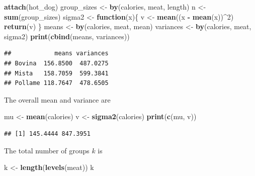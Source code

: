 \documentclass[
]{article}
\newenvironment{Shaded}{\begin{snugshade}}{\end{snugshade}}
\newcommand{\ControlFlowTok}[1]{\textcolor[rgb]{0.13,0.29,0.53}{\textbf{#1}}}
\newcommand{\DecValTok}[1]{\textcolor[rgb]{0.00,0.00,0.81}{#1}}
\newcommand{\FunctionTok}[1]{\textcolor[rgb]{0.13,0.29,0.53}{\textbf{#1}}}
\newcommand{\NormalTok}[1]{#1}
\newcommand{\OtherTok}[1]{\textcolor[rgb]{0.56,0.35,0.01}{#1}}
\newcommand{\SpecialCharTok}[1]{\textcolor[rgb]{0.81,0.36,0.00}{\textbf{#1}}}
\begin{document}
\begin{Shaded}
\begin{Highlighting}[]
\FunctionTok{attach}\NormalTok{(hot\_dog)}
\NormalTok{group\_sizes }\OtherTok{\textless{}{-}} \FunctionTok{by}\NormalTok{(calories, meat, length)}
\NormalTok{n }\OtherTok{\textless{}{-}} \FunctionTok{sum}\NormalTok{(group\_sizes)}
\NormalTok{sigma2 }\OtherTok{\textless{}{-}} \ControlFlowTok{function}\NormalTok{(x)\{}
\NormalTok{  v }\OtherTok{\textless{}{-}} \FunctionTok{mean}\NormalTok{((x }\SpecialCharTok{{-}} \FunctionTok{mean}\NormalTok{(x))}\SpecialCharTok{\^{}}\DecValTok{2}\NormalTok{)}
  \FunctionTok{return}\NormalTok{(v)}
\NormalTok{\}}
\NormalTok{means }\OtherTok{\textless{}{-}} \FunctionTok{by}\NormalTok{(calories, meat, mean)}
\NormalTok{variances }\OtherTok{\textless{}{-}} \FunctionTok{by}\NormalTok{(calories, meat, sigma2)}
\FunctionTok{print}\NormalTok{(}\FunctionTok{cbind}\NormalTok{(means, variances))}
\end{Highlighting}
\end{Shaded}

\begin{verbatim}
##            means variances
## Bovina  156.8500  487.0275
## Mista   158.7059  599.3841
## Pollame 118.7647  478.6505
\end{verbatim}

The overall mean and variance are

\begin{Shaded}
\begin{Highlighting}[]
\NormalTok{mu }\OtherTok{\textless{}{-}} \FunctionTok{mean}\NormalTok{(calories)}
\NormalTok{v }\OtherTok{\textless{}{-}} \FunctionTok{sigma2}\NormalTok{(calories)}
\FunctionTok{print}\NormalTok{(}\FunctionTok{c}\NormalTok{(mu, v))}
\end{Highlighting}
\end{Shaded}

\begin{verbatim}
## [1] 145.4444 847.3951
\end{verbatim}

The total number of groups \(k\) is

\begin{Shaded}
\begin{Highlighting}[]
\NormalTok{k }\OtherTok{\textless{}{-}} \FunctionTok{length}\NormalTok{(}\FunctionTok{levels}\NormalTok{(meat))}
\NormalTok{k}
\end{Highlighting}
\end{Shaded}
\end{document}
